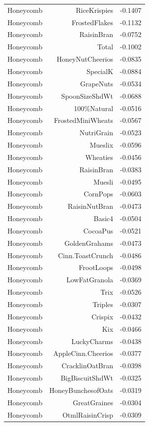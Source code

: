 \begin{longtable}{@{}lrr@{}}
Honeycomb & RiceKrispies & -0.1407 \\
Honeycomb & FrostedFlakes & -0.1132 \\
Honeycomb & RaisinBran & -0.0752 \\
Honeycomb & Total & -0.1002 \\
Honeycomb & HoneyNutCheerios & -0.0835 \\
Honeycomb & SpecialK & -0.0884 \\
Honeycomb & GrapeNuts & -0.0534 \\
Honeycomb & SpoonSizeShdWt & -0.0688 \\
Honeycomb & 100\%Natural & -0.0516 \\
Honeycomb & FrostedMiniWheats & -0.0567 \\
Honeycomb & NutriGrain & -0.0523 \\
Honeycomb & Mueslix & -0.0596 \\
Honeycomb & Wheaties & -0.0456 \\
Honeycomb & RaisinBran & -0.0383 \\
Honeycomb & Muesli & -0.0495 \\
Honeycomb & CornPops & -0.0603 \\
Honeycomb & RaisinNutBran & -0.0473 \\
Honeycomb & Basic4 & -0.0504 \\
Honeycomb & CocoaPus & -0.0521 \\
Honeycomb & GoldenGrahams & -0.0473 \\
Honeycomb & Cinn.ToastCrunch & -0.0486 \\
Honeycomb & FrootLoops & -0.0498 \\
Honeycomb & LowFatGranola & -0.0369 \\
Honeycomb & Trix & -0.0526 \\
Honeycomb & Triples & -0.0307 \\
Honeycomb & Crispix & -0.0432 \\
Honeycomb & Kix & -0.0466 \\
Honeycomb & LuckyCharms & -0.0438 \\
Honeycomb & AppleCinn.Cheerios & -0.0377 \\
Honeycomb & CracklinOatBran & -0.0398 \\
Honeycomb & BigBiscuitShdWt & -0.0325 \\
Honeycomb & HoneyBunchesofOats & -0.0319 \\
Honeycomb & GreatGraines & -0.0304 \\
Honeycomb & OtmlRaisinCrisp & -0.0309 \\

\end{longtable}
